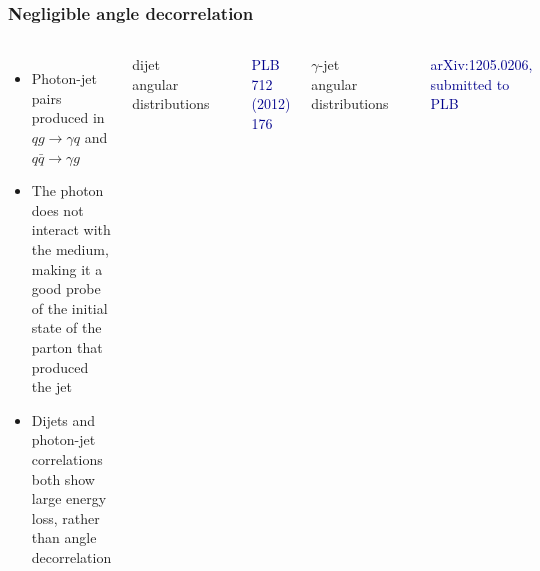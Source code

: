 \documentclass[compress]{beamer}
\begin{document}
\begin{frame}
\frametitle{Negligible angle decorrelation}

\begin{columns}

\begin{itemize}
\item Photon-jet pairs produced in $qg \to \gamma q$ and $q\bar{q} \to
  \gamma g$
\item The photon does not interact with the medium, making it a good
  probe of the initial state of the parton that produced the jet
\item Dijets and photon-jet correlations both show large energy
  loss, rather than angle decorrelation
\end{itemize}


\centering dijet angular distributions

\includegraphics[width=\linewidth]{dijets/angles_dijets.png}

\vspace{-0.2 cm}
\centering \textcolor{darkblue}{\scriptsize PLB 712 (2012) 176}

\vspace{0.2 cm}
\centering $\gamma$-jet angular distributions

\includegraphics[width=\linewidth]{dijets/angles_gammajets.png}


\vspace{-0.2 cm}
\centering \textcolor{darkblue}{\scriptsize arXiv:1205.0206, submitted to PLB}
\end{columns}

\end{frame}
\end{document}
